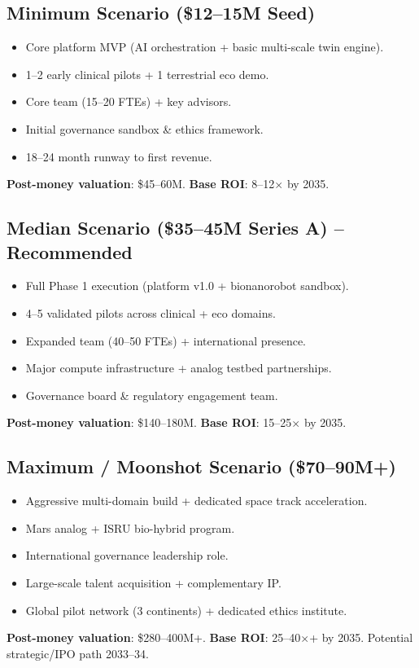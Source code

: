 \documentclass[11pt,a4paper]{article}
\begin{document}
\subsection{Minimum Scenario (\$12--15M Seed)}
\begin{itemize}
    \item Core platform MVP (AI orchestration + basic multi-scale twin engine).
    \item 1--2 early clinical pilots + 1 terrestrial eco demo.
    \item Core team (15--20 FTEs) + key advisors.
    \item Initial governance sandbox \& ethics framework.
    \item 18--24 month runway to first revenue.
\end{itemize}
\textbf{Post-money valuation}: \$45--60M. \textbf{Base ROI}: 8--12$\times$ by 2035.

\subsection{Median Scenario (\$35--45M Series A) -- Recommended}
\begin{itemize}
    \item Full Phase 1 execution (platform v1.0 + bionanorobot sandbox).
    \item 4--5 validated pilots across clinical + eco domains.
    \item Expanded team (40--50 FTEs) + international presence.
    \item Major compute infrastructure + analog testbed partnerships.
    \item Governance board \& regulatory engagement team.
\end{itemize}
\textbf{Post-money valuation}: \$140--180M. \textbf{Base ROI}: 15--25$\times$ by 2035.

\subsection{Maximum / Moonshot Scenario (\$70--90M+)}
\begin{itemize}
    \item Aggressive multi-domain build + dedicated space track acceleration.
    \item Mars analog + ISRU bio-hybrid program.
    \item International governance leadership role.
    \item Large-scale talent acquisition + complementary IP.
    \item Global pilot network (3 continents) + dedicated ethics institute.
\end{itemize}
\textbf{Post-money valuation}: \$280--400M+. \textbf{Base ROI}: 25--40$\times$+ by 2035. Potential strategic/IPO path 2033--34.
\end{document}
